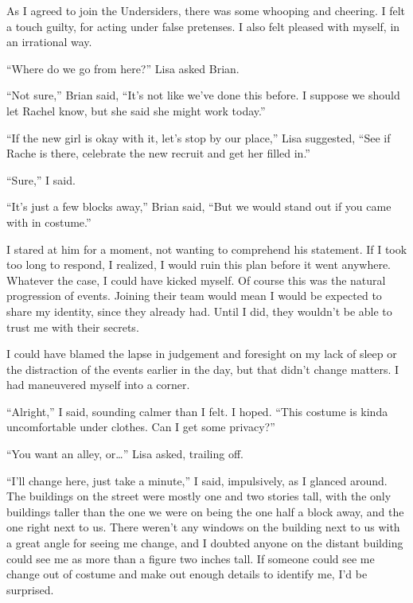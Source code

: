 





As I agreed to join the Undersiders, there was some whooping and cheering.  I felt a touch guilty, for acting under false pretenses.   I also felt pleased with myself, in an irrational way.



``Where do we go from here?'' Lisa asked Brian.



``Not sure,'' Brian said, ``It's not like we've done this before.  I suppose we should let Rachel know, but she said she might work today.''



``If the new girl is okay with it, let's stop by our place,'' Lisa suggested, ``See if Rache is there, celebrate the new recruit and get her filled in.''



``Sure,'' I said.



``It's just a few blocks away,'' Brian said, ``But we would stand out if you came with in costume.''



I stared at him for a moment, not wanting to comprehend his statement.  If I took too long to respond, I realized, I would ruin this plan before it went anywhere.  Whatever the case, I could have kicked myself.  Of course this was the natural progression of events.  Joining their team would mean I would be expected to share my identity, since they already had.  Until I did, they wouldn't be able to trust me with their secrets.



I could have blamed the lapse in judgement and foresight on my lack of sleep or the distraction of the events earlier in the day, but that didn't change matters.  I had maneuvered myself into a corner.



``Alright,'' I said, sounding calmer than I felt.  I hoped.  ``This costume is kinda uncomfortable under clothes.  Can I get some privacy?''



``You want an alley, or\ldots'' Lisa asked, trailing off.



``I'll change here,  just take a minute,'' I said, impulsively, as I glanced around.  The buildings on the street were mostly one and two stories tall, with the only buildings taller than the one we were on being the one half a block away, and the one right next to us. There weren't any windows on the building next to us with a great angle for seeing me change, and I doubted anyone on the distant building could see me as more than a figure two inches tall.  If someone could see me change out of costume and make out enough details to identify me, I'd be surprised.




